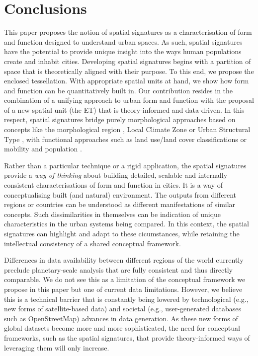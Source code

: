 \section{Conclusions}
\label{sec:conclusions}

This paper proposes the notion of spatial signatures as a characterisation of
form and function designed to understand urban spaces.
%
As such,
spatial signatures have the potential to provide unique insight into the ways
human populations create and inhabit cities.
%
Developing spatial signatures begins with a partition of space that is
theoretically aligned with their purpose. To this end, we propose the enclosed
tessellation. With appropriate spatial units at hand, we show how form and
function can be quantitatively built in.
%
Our contribution resides in the combination of a unifying approach to urban
form and function with the proposal of a new spatial unit (the ET) that is
theory-informed and data-driven.
%
In this respect, spatial signatures bridge
purely morphological approaches based on concepts like the morphological region
\citep{oliveira2020}, Local Climate Zone \citep{stewart2012} or Urban
Structural Type \citep{lehner2019}, with functional approaches such as land
use/land cover classifications \citep{georganos2018very} or mobility and
population \citep{gale2016creating}.

Rather than a particular technique or a rigid application, the spatial
signatures provide a \textit{way of thinking} about building detailed,
scalable and internally consistent characterisations of form and function in
cities. It is a way of conceptualising built (and natural) environment.
%
The outputs from different regions or countries can be understood as
different manifestations of similar concepts.
%
Such dissimilarities in themselves can be indication of unique
characteristics in the urban systems being compared.
%
In this context, the
spatial signatures can highlight and adapt to these cicumstances, while
retaining the intellectual consistency of a shared conceptual framework.

Differences in data availability between different regions of the
world currently preclude planetary-scale analysis that are fully consistent
and thus directly comparable. We do not see this as a limitation of the
conceptual framework we propose in this paper but one of current
data limitations. However, we believe this is a technical barrier that is
constantly being lowered by technological (e.g., new forms of satellite-based
data) and societal (e.g., user-generated databases such as OpenStreetMap)
advances in data generation. As these new forms of global datasets become
more and more sophisticated, the need for conceptual frameworks, such as the
spatial signatures, that provide theory-informed ways of leveraging them will
only increase.

